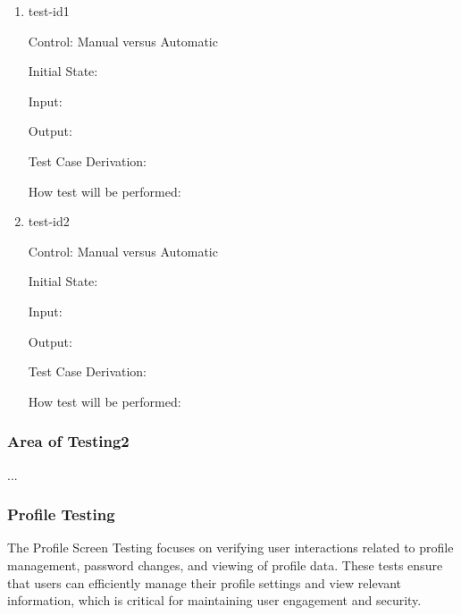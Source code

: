 \documentclass[12pt, titlepage]{article}
\begin{document}
\begin{enumerate}

\item{test-id1\\}

Control: Manual versus Automatic
					
Initial State: 
					
Input: 
					
Output: 

Test Case Derivation: 
					
How test will be performed: 
					
\item{test-id2\\}

Control: Manual versus Automatic
					
Initial State: 
					
Input: 
					
Output: 

Test Case Derivation: 

How test will be performed: 

\end{enumerate}

\subsubsection{Area of Testing2}

...

\subsubsection{Profile Testing}
\label{sec:profile_screen_testing}

The Profile Screen Testing focuses on verifying user interactions related to profile management, password changes, and viewing of profile data. These tests ensure that users can efficiently manage their profile settings and view relevant information, which is critical for maintaining user engagement and security.
\end{document}
